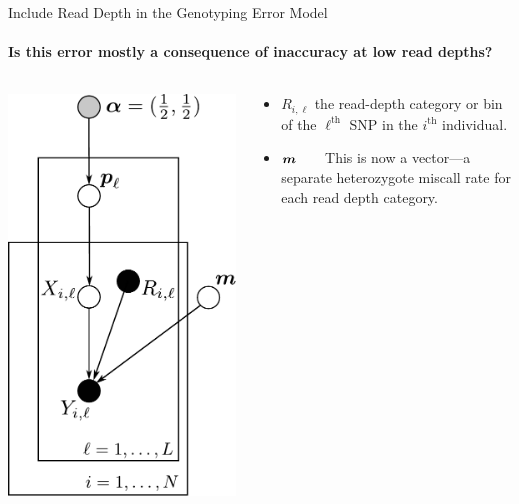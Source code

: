 \documentclass[letter,graphicx]{beamer}
\newcommand{\thh}{^\mathrm{th}}
\def\bm#1{\mathpalette\bmstyle{#1}}
\def\bmstyle#1#2{\mbox{\boldmath$#1#2$}}
\begin{document}
\begin{frame}{Include Read Depth in the Genotyping Error Model}
\framesubtitle{Is this error mostly a consequence of inaccuracy at low read depths?}


\begin{columns}
    \begin{column}{0.38\textwidth}
        \includegraphics[width=1.0\textwidth]{./images/geno-err-model-with-read-depth.pdf}
    \end{column}
    \begin{column}{0.58\textwidth}
        \begin{itemize}
        \item $R_{i,\ell}$ the read-depth category or bin of the $\ell\thh$ SNP in the $i\thh$ individual.
        \item $\bm{m}$~~~~This is now a vector---a separate heterozygote miscall rate for each read depth category.
        \end{itemize}
    \end{column}
\end{columns}
\end{frame}
\end{document}
